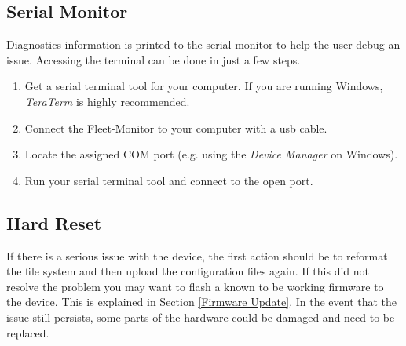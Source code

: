 \newpage

\subsection{Serial Monitor} \label{Serial Monitor}
Diagnostics information is printed to the serial monitor to help the user debug an issue. Accessing the terminal can be done in just a few steps.

\begin{enumerate}
  \item Get a serial terminal tool for your computer. If you are running Windows, \mbox{\textit{TeraTerm}} is highly recommended. 
  \item Connect the Fleet-Monitor to your computer with a \acrshort{usb} cable.
  \item Locate the assigned COM port (e.g. using the \textit{Device Manager} on Windows).
  \item Run your serial terminal tool and connect to the open port.
\end{enumerate}


\subsection{Hard Reset} \label{Hard Reset}
If there is a serious issue with the device, the first action should be to reformat the file system and then upload the configuration files again. If this did not resolve the problem you may want to flash a known to be working firmware to the device. This is explained in Section \ref{Firmware Update}. In the event that the issue still persists, some parts of the hardware could be damaged and need to be replaced.




